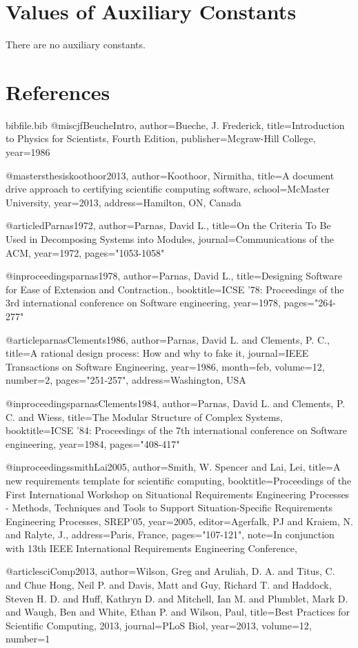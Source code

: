 \documentclass[12pt]{article}
\begin{document}
\section{Values of Auxiliary Constants}
\label{Sec:AuxConstants}
There are no auxiliary constants.
\section{References}
\label{Sec:References}
\begin{filecontents*}{bibfile.bib}
@misc{jfBeucheIntro,
author={Bueche, J. Frederick},
title={Introduction to Physics for Scientists, Fourth Edition},
publisher={Mcgraw-Hill College},
year={1986}}

@mastersthesis{koothoor2013,
author={Koothoor, Nirmitha},
title={A document drive approach to certifying scientific computing software},
school={McMaster University},
year={2013},
address={Hamilton, ON, Canada}}

@article{dParnas1972,
author={Parnas, David L.},
title={On the Criteria To Be Used in Decomposing Systems into Modules},
journal={Communications of the ACM},
year={1972},
pages={"1053-1058"}}

@inproceedings{parnas1978,
author={Parnas, David L.},
title={Designing Software for Ease of Extension and Contraction.},
booktitle={ICSE '78: Proceedings of the 3rd international conference on Software engineering},
year={1978},
pages={"264-277"}}

@article{parnasClements1986,
author={Parnas, David L. and Clements, P. C.},
title={A rational design process: How and why to fake it},
journal={IEEE Transactions on Software Engineering},
year={1986},
month=feb,
volume={12},
number={2},
pages={"251-257"},
address={Washington, USA}}

@inproceedings{parnasClements1984,
author={Parnas, David L. and Clements, P. C. and Wiess},
title={The Modular Structure of Complex Systems},
booktitle={ICSE '84: Proceedings of the 7th international conference on Software engineering},
year={1984},
pages={"408-417"}}

@inproceedings{smithLai2005,
author={Smith, W. Spencer and Lai, Lei},
title={A new requirements template for scientific computing},
booktitle={Proceedings of the First International Workshop on Situational Requirements Engineering Processes - Methods, Techniques and Tools to Support Situation-Specific Requirements Engineering Processes, SREP'05},
year={2005},
editor={Agerfalk, PJ and Kraiem, N. and Ralyte, J.},
address={Paris, France},
pages={"107-121"},
note={In conjunction with 13th IEEE International Requirements Engineering Conference,}}

@article{sciComp2013,
author={Wilson, Greg and Aruliah, D. A. and Titus, C. and Chue Hong, Neil P. and Davis, Matt and Guy, Richard T. and Haddock, Steven H. D. and Huff, Kathryn D. and Mitchell, Ian M. and Plumblet, Mark D. and Waugh, Ben and White, Ethan P. and Wilson, Paul},
title={Best Practices for Scientific Computing, 2013},
journal={PLoS Biol},
year={2013},
volume={12},
number={1}}
\end{filecontents*}
\nocite{*}
\printbibliography[heading=none]
\end{document}
